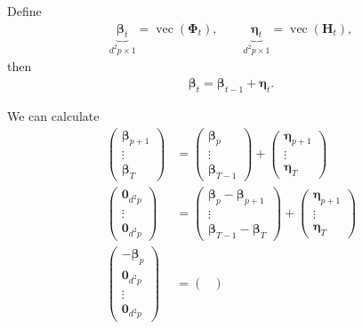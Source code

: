 \documentclass[fleqn]{article}
\begin{document}
Define
\begin{align*}
    \underbrace{\bm \beta_t}_{d^2p \times 1} = \operatorname{vec}(\bm \Phi_t), \qquad \underbrace{\bm \eta_t}_{d^2p \times 1} = \operatorname{vec}(\bm H_t),
\end{align*}
then
\begin{align*}
    \bm \beta_t = \bm \beta_{t-1} + \bm \eta_t.
\end{align*}

We can calculate
\begin{align*}
    \begin{pmatrix}
        \bm \beta_{p+1} \\
        \vdots \\
        \bm \beta_{T}
    \end{pmatrix}
    &=
    \begin{pmatrix}
        \bm \beta_p \\
        \vdots \\
        \bm \beta_{T-1}
    \end{pmatrix}
    +
    \begin{pmatrix}
        \bm \eta_{p+1} \\
        \vdots \\
        \bm \eta_T
    \end{pmatrix} \\
    \begin{pmatrix}
        \bm 0_{d^2p} \\
        \vdots \\
        \bm 0_{d^2p}
    \end{pmatrix}
    &= \begin{pmatrix}
        \bm \beta_p - \bm \beta_{p+1} \\
        \vdots \\
        \bm \beta_{T-1} - \bm \beta_T
    \end{pmatrix}
    +
    \begin{pmatrix}
        \bm \eta_{p+1} \\
        \vdots \\
        \bm \eta_T
    \end{pmatrix} \\
    \begin{pmatrix}
        - \bm \beta_p \\
        \bm 0_{d^2p} \\
        \vdots \\
        \bm 0_{d^2p}
    \end{pmatrix}
    &= \begin{pmatrix}

\end{pmatrix}
\end{align*}
\end{document}
